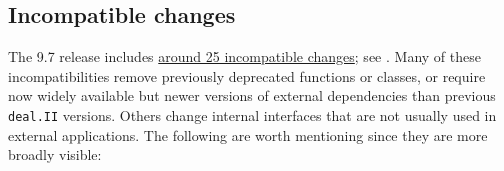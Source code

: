 \documentclass{ansarticle-preprint}
\newcommand{\specialword}[1]{\texttt{#1}}
\newcommand{\dealii}{{\specialword{deal.II}}\xspace}
\begin{document}
\subsection{Incompatible changes}\label{subsec:deprecated}

The 9.7 release includes
\href{https://dealii.org/developer/doxygen/deal.II/changes_between_9_6_0_and_9_7_0.html}
     {around 25 incompatible changes};
see \cite{changes97}. Many of these
incompatibilities remove previously deprecated functions or classes,
or require now widely available but newer versions of external
dependencies than previous \dealii{} versions. Others
change internal
interfaces that are not usually used in external
applications. The following are worth mentioning since they
are more broadly visible:
\end{document}
